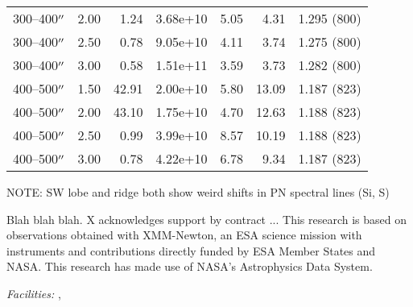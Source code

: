 \documentclass[twocolumn,tighten,trackchanges]{aastex6}
\begin{document}
\begin{table*}
\begin{tabular}{@{}lrrrrrr@{}}
        300--400$\mbox{$^{\prime\prime}$}$ & 2.00 & 1.24 & 3.68e+10 & 5.05 & 4.31 & 1.295 (800) \\  %
        300--400$\mbox{$^{\prime\prime}$}$ & 2.50 & 0.78 & 9.05e+10 & 4.11 & 3.74 & 1.275 (800) \\  %
        300--400$\mbox{$^{\prime\prime}$}$ & 3.00 & 0.58 & 1.51e+11 & 3.59 & 3.73 & 1.282 (800) \\  %
        \midrule
        400--500$\mbox{$^{\prime\prime}$}$ & 1.50 & 42.91 & 2.00e+10 & 5.80 & 13.09 & 1.187 (823) \\  %
        400--500$\mbox{$^{\prime\prime}$}$ & 2.00 & 43.10 & 1.75e+10 & 4.70 & 12.63 & 1.188 (823) \\  %
        400--500$\mbox{$^{\prime\prime}$}$ & 2.50 & 0.99 & 3.99e+10 & 8.57 & 10.19 & 1.188 (823) \\  %
        400--500$\mbox{$^{\prime\prime}$}$ & 3.00 & 0.78 & 4.22e+10 & 6.78 & 9.34 & 1.187 (823) \\  %
        \bottomrule
    \end{tabular}
\end{table*}




NOTE: SW lobe and ridge both show weird shifts in PN spectral lines (Si, S)


\acknowledgments

Blah blah blah.
X acknowledges support by contract ...
This research is based on observations obtained with XMM-Newton, an ESA science
mission with instruments and contributions directly funded by ESA Member States
and NASA.
This research has made use of NASA's Astrophysics Data System.

{\it Facilities:} , 





%

\listofchanges
\end{document}
